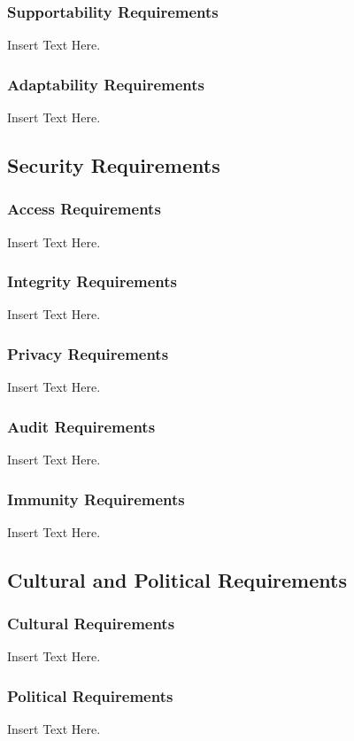 \documentclass [12pt]{article}
\begin{document}
\subsubsection{Supportability Requirements }
		Insert Text Here.

\subsubsection{Adaptability Requirements}
		Insert Text Here.


\subsection{Security Requirements }
\subsubsection{Access Requirements }
		Insert Text Here.

\subsubsection{Integrity Requirements }
		Insert Text Here.

\subsubsection{Privacy Requirements }
		Insert Text Here.

\subsubsection{Audit  Requirements }
		Insert Text Here. 

\subsubsection{Immunity Requirements  }
		Insert Text Here.

\subsection{Cultural and Political Requirements } 
\subsubsection{Cultural Requirements }
		Insert Text Here.

\subsubsection{Political Requirements }
		Insert Text Here.
\end{document}
